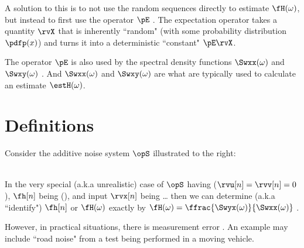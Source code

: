 A solution to this is to not use the random sequences directly to estimate $\fH(\omega)$, 
but instead to first use the  operator $\pE$ .
The expectation operator takes a quantity $\rvX$ that is inherently ``random" 
(with some probability distribution $\pdfp(x)$) and 
turns it into a deterministic ``constant" $\pE\rvX$.

The operator $\pE$ is also used by the spectral density functions 
$\Swxx(\omega)$ and $\Swxy(\omega)$ .
And $\Swxx(\omega)$ and $\Swxy(\omega)$ are what are typically used to calculate 
an estimate $\estH(\omega)$.

\section{Definitions}
\begin{minipage}{\tw-70mm}
Consider the additive noise system $\opS$ illustrated to the right:
\end{minipage}
\hfill{}
\\
In the very special (a.k.a unrealistic) case of $\opS$ having 
($\rvu[n]=\rvv[n]=0$), 
$\fh[n]$ being  (), 
and input $\rvx[n]$ being \ldots
then we can determine (a.k.a ``identify") $\fh[n]$ or $\fH(\omega)$
exactly by $\fH(\omega)=\ffrac{\Swyx(\omega)}{\Swxx(\omega)}$ .

However, in practical situations, there is measurement error . 
An example may include 
``road noise" from a test being performed in a moving vehicle.

